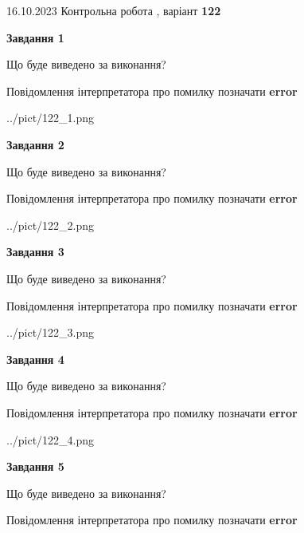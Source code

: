 \documentclass[12pt, ukrainian]{article}
\begin{document}
{\Large{16.10.2023 Контрольна робота , варіант  \No \textbf { 122 }\par}}
{
\begin {large}
{\begin {center}\textbf{Завдання 1}\end {center}}\par
Що буде виведено за виконання? \par
Повідомлення інтерпретатора про помилку позначати \textbf{error}

\begin{center}
	{../pict/122_1.png}
\end{center}
\newpage

{\begin {center}\textbf{Завдання 2}\end {center}}\par
Що буде виведено за виконання? \par
Повідомлення інтерпретатора про помилку позначати \textbf{error}

\begin{center}
	{../pict/122_2.png}
\end{center}
\newpage

{\begin {center}\textbf{Завдання 3}\end {center}}\par
Що буде виведено за виконання? \par
Повідомлення інтерпретатора про помилку позначати \textbf{error}

\begin{center}
	{../pict/122_3.png}
\end{center}
\newpage

{\begin {center}\textbf{Завдання 4}\end {center}}\par
Що буде виведено за виконання? \par
Повідомлення інтерпретатора про помилку позначати \textbf{error}

\begin{center}
	{../pict/122_4.png}
\end{center}
\newpage

{\begin {center}\textbf{Завдання 5}\end {center}}\par
Що буде виведено за виконання? \par
Повідомлення інтерпретатора про помилку позначати \textbf{error}


\end{large}}
\end{document}
